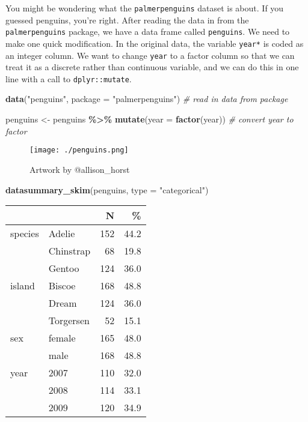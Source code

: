 \documentclass[
]{article}
\newenvironment{Shaded}{\begin{snugshade}}{\end{snugshade}}
\newcommand{\AttributeTok}[1]{\textcolor[rgb]{0.13,0.29,0.53}{#1}}
\newcommand{\CommentTok}[1]{\textcolor[rgb]{0.56,0.35,0.01}{\textit{#1}}}
\newcommand{\FunctionTok}[1]{\textcolor[rgb]{0.13,0.29,0.53}{\textbf{#1}}}
\newcommand{\NormalTok}[1]{#1}
\newcommand{\OtherTok}[1]{\textcolor[rgb]{0.56,0.35,0.01}{#1}}
\newcommand{\SpecialCharTok}[1]{\textcolor[rgb]{0.81,0.36,0.00}{\textbf{#1}}}
\newcommand{\StringTok}[1]{\textcolor[rgb]{0.31,0.60,0.02}{#1}}
\begin{document}
You might be wondering what the \texttt{palmerpenguins} dataset is
about. If you guessed penguins, you're right. After reading the data in
from the \texttt{palmerpenguins} package, we have a data frame called
\texttt{penguins}. We need to make one quick modification. In the
original data, the variable \texttt{year*} is coded as an integer
column. We want to change \texttt{year} to a factor column so that we
can treat it as a discrete rather than continuous variable, and we can
do this in one line with a call to \texttt{dplyr::mutate}.

\begin{Shaded}
\begin{Highlighting}[]
\FunctionTok{data}\NormalTok{(}\StringTok{"penguins"}\NormalTok{, }\AttributeTok{package =} \StringTok{"palmerpenguins"}\NormalTok{) }\CommentTok{\# read in data from package }

\NormalTok{penguins }\OtherTok{\textless{}{-}}\NormalTok{ penguins }\SpecialCharTok{\%\textgreater{}\%}
  \FunctionTok{mutate}\NormalTok{(}\AttributeTok{year =} \FunctionTok{factor}\NormalTok{(year)) }\CommentTok{\# convert \textasciigrave{}year\textasciigrave{} to factor}
\end{Highlighting}
\end{Shaded}

\begin{figure}
\centering
\texttt{[image: ./penguins.png]}
\caption{Artwork by @allison\_horst}
\end{figure}

\begin{Shaded}
\begin{Highlighting}[]
\FunctionTok{datasummary\_skim}\NormalTok{(penguins, }\AttributeTok{type =} \StringTok{"categorical"}\NormalTok{)}
\end{Highlighting}
\end{Shaded}

\begin{table}
\centering
\begin{tabular}[t]{llrr}
\toprule
  &    & N & \%\\
\midrule
species & Adelie & 152 & \num{44.2}\\
 & Chinstrap & 68 & \num{19.8}\\
 & Gentoo & 124 & \num{36.0}\\
island & Biscoe & 168 & \num{48.8}\\
 & Dream & 124 & \num{36.0}\\
 & Torgersen & 52 & \num{15.1}\\
sex & female & 165 & \num{48.0}\\
 & male & 168 & \num{48.8}\\
year & 2007 & 110 & \num{32.0}\\
 & 2008 & 114 & \num{33.1}\\
 & 2009 & 120 & \num{34.9}\\
\bottomrule
\end{tabular}
\end{table}
\end{document}
